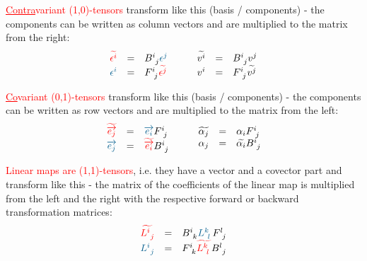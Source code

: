 \textcolor{red}{\underline{Contra}variant (1,0)-tensors} transform like this (basis /
components) - the components can be written as column vectors and are multiplied to the
matrix from the right:
\begin{equation}
    \begin{array}{rcl}
        \hdcbtvc{i} & = & B^{i~}_{~j} \hdcbvc{j} \\
        \hdcbvc{i} & = & F^{i~}_{~j}  \hdcbtvc{j}
    \end{array}
    \qquad
    \begin{array}{rcl}
        \hdtvc{i} & = & B^{i~}_{~j} \hdvc{j} \\
        \hdvc{i} & = & F^{i~}_{~j}  \hdtvc{j}
    \end{array}
\end{equation}

\textcolor{red}{\underline{Co}variant (0,1)-tensors} transform like this (basis /
components) - the components can be written as row vectors and are multiplied to the
matrix from the left:
\begin{equation}
    \begin{array}{rcl}
        \hdbtv{j} & = & \hdbv{i}  F^{i~}_{~j} \\
        \hdbv{j} & = & \hdbtv{i} B^{i~}_{~j} 
    \end{array}
    \qquad
    \begin{array}{rcl}
        \widetilde{{\alpha_j}} & = & {\alpha_i} F^{i~}_{~j}  \\
        {\alpha_j} & = & \widetilde{{\alpha_i}} B^{i~}_{~j}
    \end{array}
\end{equation}

\textcolor{red}{Linear maps are (1,1)-tensors}, i.e. they have a vector and a covector
part and transform like this - the matrix of the coefficients of the linear map is
multiplied from the left and the right with the respective forward or backward
transformation matrices:
\begin{equation}
    \begin{array}{rcl}
        \textcolor{red}{\widetilde{L^{i~}_{~j}}} & = &
        B^{i~}_{~k} \textcolor{MidnightBlue}{L^{k~}_{~l}} F^{l~}_{~j} \\
        \textcolor{MidnightBlue}{L^{i~}_{~j}} & = &
        F^{i~}_{~k} \textcolor{red}{\widetilde{L^{k~}_{~l}}} B^{l~}_{~j}
    \end{array}
\end{equation}

\newpage
